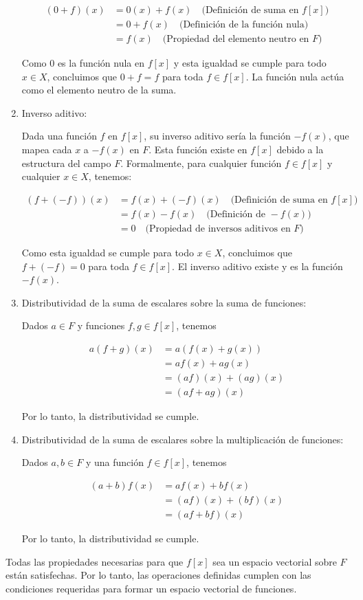 \begin{enumerate}
    \begin{align*}
        (0 + f)(x) &= 0(x) + f(x) \quad \text{(Definición de suma en } f[x]\text{)} \\
        &= 0 + f(x) \quad \text{(Definición de la función nula)} \\
        &= f(x) \quad \text{(Propiedad del elemento neutro en } F\text{)}
    \end{align*}
    
    Como $0$ es la función nula en $f[x]$ y esta igualdad se cumple para todo $x \in X$, concluimos que $0 + f = f$ para toda $f \in f[x]$. La función nula actúa como el elemento neutro de la suma.

    \item Inverso aditivo:
    
    Dada una función $f$ en $f[x]$, su inverso aditivo sería la función $-f(x)$, que mapea cada $x$ a $-f(x)$ en $F$. Esta función existe en $f[x]$ debido a la estructura del campo $F$. Formalmente, para cualquier función $f \in f[x]$ y cualquier $x \in X$, tenemos:
    
    \begin{align*}
        (f + (-f))(x) &= f(x) + (-f)(x) \quad \text{(Definición de suma en } f[x]\text{)} \\
        &= f(x) - f(x) \quad \text{(Definición de } -f(x)\text{)} \\
        &= 0 \quad \text{(Propiedad de inversos aditivos en } F\text{)}
    \end{align*}
    
    Como esta igualdad se cumple para todo $x \in X$, concluimos que $f + (-f) = 0$ para toda $f \in f[x]$. El inverso aditivo existe y es la función $-f(x)$.
    
    \item Distributividad de la suma de escalares sobre la suma de funciones: 
    
    Dados $a \in F$ y funciones $f, g \in f[x]$, tenemos
    
    \begin{align*}
        a(f + g)(x) &= a(f(x) + g(x)) \\
        &= af(x) + ag(x) \\
        &= (af)(x) + (ag)(x) \\
        &= (af + ag)(x)
    \end{align*}
    
    Por lo tanto, la distributividad se cumple.

    \item Distributividad de la suma de escalares sobre la multiplicación de funciones: 
    
    Dados $a, b \in F$ y una función $f \in f[x]$, tenemos
    
    \begin{align*}
        (a + b)f(x) &= af(x) + bf(x) \\
        &= (af)(x) + (bf)(x) \\
        &= (af + bf)(x)
    \end{align*}
    
    Por lo tanto, la distributividad se cumple.
    
\end{enumerate}

Todas las propiedades necesarias para que $f[x]$ sea un espacio vectorial sobre $F$ están satisfechas. Por lo tanto, las operaciones definidas cumplen con las condiciones requeridas para formar un espacio vectorial de funciones.
